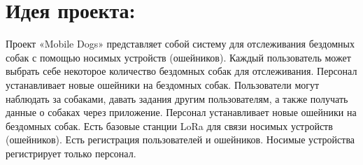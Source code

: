 \documentclass[letterpaper,10pt,russian]{sphinxmanual}
\begin{document}
\chapter{Идея проекта:}
\label{\detokenize{README:id1}}
\sphinxAtStartPar
Проект «Mobile Dogs» представляет собой систему для отслеживания бездомных собак с помощью носимых устройств (ошейников).
Каждый пользователь может выбрать себе некоторое количество бездомных собак для отслеживания.
Персонал устанавливает новые ошейники на бездомных собак.
Пользователи могут наблюдать за собаками, давать задания другим пользователям, а также получать данные о собаках через приложение.
Персонал устанавливает новые ошейники на бездомных собак.
Есть базовые станции LoRa для связи носимых устройств (ошейников).
Есть регистрация пользователей и ошейников. Носимые устройства регистрирует только персонал.
\end{document}
